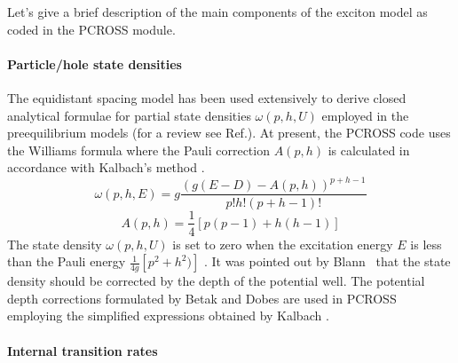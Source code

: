 Let's give a brief description of the main components of the exciton model
as coded in the PCROSS module.

\paragraph{Particle/hole state densities}

The equidistant spacing model has been used extensively to derive closed
analytical formulae for partial state densities $\omega (p,h,U)$ employed in
the preequilibrium models (for a review see Ref.\cite{RIPL2}). At present,
the PCROSS code uses the Williams formula \cite{Williams:71} where the Pauli
correction $A(p,h)$ is calculated in accordance with Kalbach's method \cite%
{Kalbach:83}.
\begin{equation}
\omega (p,h,E)=g\frac{\left( g(E-D)-A(p,h)\right) ^{p+h-1}}{p!h!(p+h-1)!}
\end{equation}%
\begin{equation*}
A(p,h)=\frac{1}{4}\left[ p(p-1)+h(h-1)\right]
\end{equation*}%
The state density $\omega (p,h,U)$ is set to zero when the excitation energy
$E$ is less than the Pauli energy $\frac{1}{4g}\left[ p^{2}+h^{2})\right] $
\cite{Baguer:89}. It was pointed out by Blann~\cite{Blann:72} that the state
density should be corrected by the depth of the potential well. The
potential depth corrections formulated by Betak and Dobes \cite{Betak:76}
are used in PCROSS employing the simplified expressions obtained by Kalbach
\cite{Kalbach:77,Kalbach:83}.

\paragraph{Internal transition rates}

